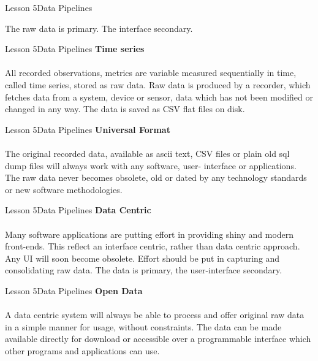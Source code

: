 \documentclass[aspectratio=1610]{beamer}
\begin{document}
\begin{frame}{Lesson 5}{Data Pipelines}
\Huge
\begin{center}
The raw data is primary. The interface secondary.
\end{center}
\end{frame}



\begin{frame}{Lesson 5}{Data Pipelines}
\LARGE
\textbf{Time series}\\~\\
All recorded observations, metrics are variable measured
sequentially in time, called time series, stored as raw data. Raw
data is produced by a recorder, which fetches data from a system,
device or sensor, data which has not been modified or changed in any
way. The data is saved as CSV flat files on disk.
\end{frame}



\begin{frame}{Lesson 5}{Data Pipelines}
\LARGE
\textbf{Universal Format}\\~\\
The original recorded data, available as ascii text, CSV files or 
plain old sql dump files will always work with any software, user-
interface or applications. The raw data never becomes obsolete, old 
or dated by any technology standards or new software methodologies.
\end{frame}



\begin{frame}{Lesson 5}{Data Pipelines}
\LARGE
\textbf{Data Centric}\\~\\
Many software applications are putting effort in providing shiny and 
modern front-ends. This reflect an interface centric, rather than 
data centric approach. Any UI will soon become obsolete. Effort 
should be put in capturing and consolidating raw data. The data is 
primary, the user-interface secondary.
\end{frame}



\begin{frame}{Lesson 5}{Data Pipelines}
\LARGE
\textbf{Open Data}\\~\\
A data centric system will always be able to process and offer 
original raw data in a simple manner for usage, without constraints. 
The data can be made available directly for download or accessible 
over a programmable interface which other programs and applications 
can use.
\end{frame}
\end{document}
